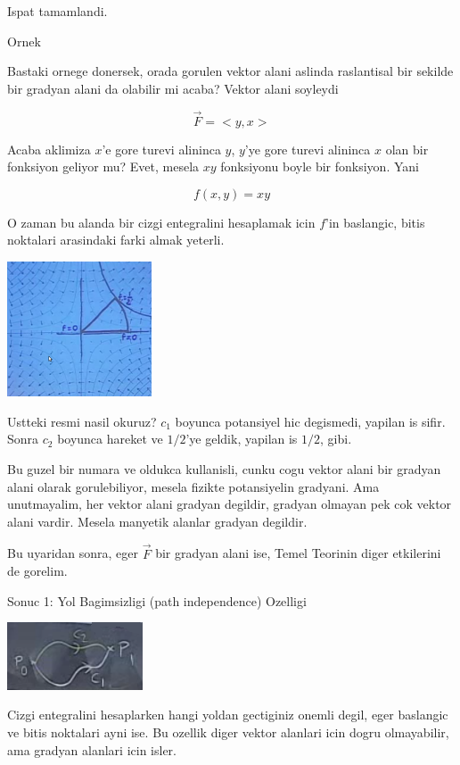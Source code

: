 \documentclass[12pt,fleqn]{article}\usepackage{../common}
\begin{document}
Ispat tamamlandi. 

Ornek

Bastaki ornege donersek, orada gorulen vektor alani aslinda raslantisal bir
sekilde bir gradyan alani da olabilir mi acaba? Vektor alani soyleydi

\[ \vec{F} = <y,x> \]

Acaba aklimiza $x$'e gore turevi alininca $y$, $y$'ye gore turevi alininca
$x$ olan bir fonksiyon geliyor mu? Evet, mesela $xy$ fonksiyonu boyle bir
fonksiyon. Yani

\[ f(x,y) = xy \]

O zaman bu alanda bir cizgi entegralini hesaplamak icin $f$'in baslangic,
bitis noktalari arasindaki farki almak yeterli. 

\includegraphics[height=4cm]{20_6.png}

Ustteki resmi nasil okuruz? $c_1$ boyunca potansiyel hic degismedi, yapilan
is sifir. Sonra $c_2$ boyunca hareket ve $1/2$'ye geldik, yapilan is $1/2$,
gibi. 

Bu guzel bir numara ve oldukca kullanisli, cunku cogu vektor alani bir
gradyan alani olarak gorulebiliyor, mesela fizikte potansiyelin
gradyani. Ama unutmayalim, her vektor alani gradyan degildir, gradyan
olmayan pek cok vektor alani vardir. Mesela manyetik alanlar gradyan
degildir. 

Bu uyaridan sonra, eger $\vec{F}$ bir gradyan alani ise, Temel Teorinin
diger etkilerini de gorelim. 

Sonuc 1: Yol Bagimsizligi (path independence) Ozelligi

\includegraphics[height=2cm]{20_7.png}

Cizgi entegralini hesaplarken hangi yoldan gectiginiz onemli degil, eger
baslangic ve bitis noktalari ayni ise. Bu ozellik diger vektor alanlari
icin dogru olmayabilir, ama gradyan alanlari icin isler.
\end{document}
